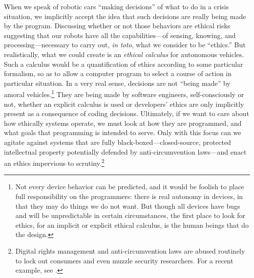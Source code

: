 
When we
speak of robotic cars ``making decisions'' of what to do in a crisis
situation, we implicitly accept the idea that such decisions are
really being made by the program. Discussing whether or not those
behaviors are ethical risks suggesting that our robots have all the
capabilities---of sensing, knowing, and processing---necessary to
carry out, \emph{in toto}, what we consider to be ``ethics.'' But
realistically, what we could create is an \emph{ethical calculus} for 
autonomous vehicles. Such a calculus would be a quantification of
ethics according to some particular formalism, so as to allow a
computer program to select a course of action in particular
situation. In a very real sense, decisions are not
``being made'' by amoral vehicles.\footnote{Not every device behavior
can be predicted, and it would be foolish to place full responsibility
on the programmers: there is real autonomy in devices, in that they
may do things we do not want. But though all devices have bugs and
will be unpredictable in certain circumstances, the first place to
look for ethics, for an implicit or explicit ethical calculus, is the
human beings 
that do the design.} They are being made by software engineers,
self-consciously or not, whether an
explicit calculus is used or developers' ethics are only
implicitly present as a consequence of coding decisions. Ultimately,
if we want to care about how ethically systems
operate, we must look at how they are programmed, and what goals that
programming is intended to serve. Only with this focus can we agitate
against systems that are fully black-boxed---closed-source, protected
intellectual property potentially defended by anti-circumvention
laws---and enact an ethics impervious to scrutiny.\footnote{Digital
  rights management and anti-circumvention laws are abused routinely
  to lock out consumers and even muzzle security researchers. For a
  recent example, see \cite{higgins}.
}



